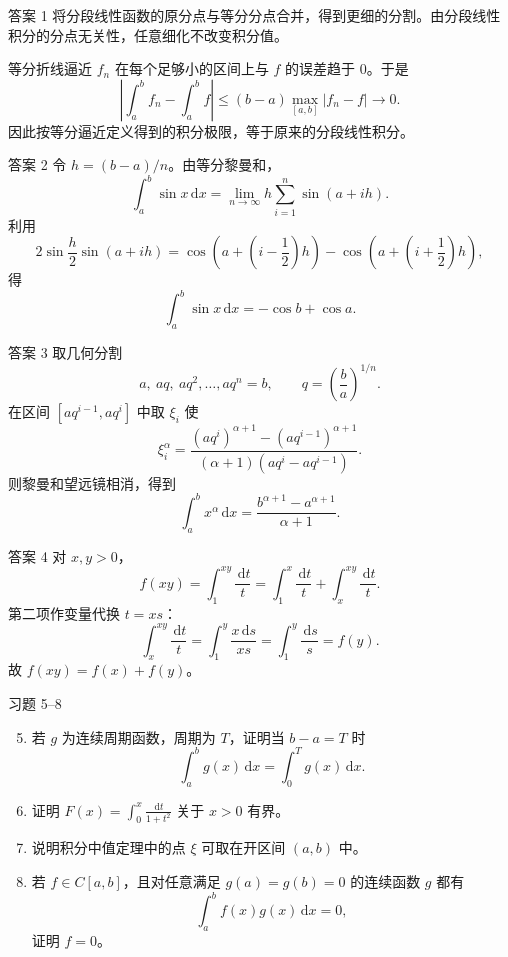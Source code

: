 ﻿\documentclass[aspectratio=169,11pt]{ctexbeamer}
\newcommand{\dd}{\,\mathrm{d}}
\newcommand{\abs}[1]{\left|#1\right|}
\begin{document}
\begin{frame}{答案 1}
  将分段线性函数的原分点与等分分点合并，得到更细的分割。由分段线性积分的分点无关性，任意细化不改变积分值。

  等分折线逼近 $f_n$ 在每个足够小的区间上与 $f$ 的误差趋于 $0$。于是
  \[
    \abs{\int_a^b f_n-\int_a^b f}
    \le (b-a)\max_{[a,b]}\abs{f_n-f}\to0.
  \]
  因此按等分逼近定义得到的积分极限，等于原来的分段线性积分。
\end{frame}

\begin{frame}{答案 2}
  令 $h=(b-a)/n$。由等分黎曼和，
  \[
    \int_a^b\sin x\dd x
    =\lim_{n\to\infty}h\sum_{i=1}^{n}\sin(a+ih).
  \]
  利用
  \[
    2\sin\frac h2\sin(a+ih)
    =\cos\!\left(a+\left(i-\frac12\right)h\right)
     -\cos\!\left(a+\left(i+\frac12\right)h\right),
  \]
  得
  \[
    \int_a^b\sin x\dd x
    =-\cos b+\cos a.
  \]
\end{frame}

\begin{frame}{答案 3}
  取几何分割
  \[
    a,\ aq,\ aq^2,\ldots,aq^n=b,\qquad q=\left(\frac ba\right)^{1/n}.
  \]
  在区间 $[aq^{i-1},aq^i]$ 中取 $\xi_i$ 使
  \[
    \xi_i^\alpha=\frac{(aq^i)^{\alpha+1}-(aq^{i-1})^{\alpha+1}}
    {(\alpha+1)(aq^i-aq^{i-1})}.
  \]
  则黎曼和望远镜相消，得到
  \[
    \int_a^b x^\alpha\dd x
    =\frac{b^{\alpha+1}-a^{\alpha+1}}{\alpha+1}.
  \]
\end{frame}

\begin{frame}{答案 4}
  对 $x,y>0$，
  \[
    f(xy)=\int_1^{xy}\frac{\dd t}{t}
    =\int_1^x\frac{\dd t}{t}+\int_x^{xy}\frac{\dd t}{t}.
  \]
  第二项作变量代换 $t=xs$：
  \[
    \int_x^{xy}\frac{\dd t}{t}
    =\int_1^y\frac{x\dd s}{xs}
    =\int_1^y\frac{\dd s}{s}=f(y).
  \]
  故 $f(xy)=f(x)+f(y)$。
\end{frame}

\begin{frame}{习题 5--8}
  \begin{enumerate}
    \setcounter{enumi}{4}
    \item 若 $g$ 为连续周期函数，周期为 $T$，证明当 $b-a=T$ 时
    \[
      \int_a^b g(x)\dd x=\int_0^T g(x)\dd x.
    \]
    \item 证明 $F(x)=\displaystyle\int_0^x\frac{\dd t}{1+t^2}$ 关于 $x>0$ 有界。
    \item 说明积分中值定理中的点 $\xi$ 可取在开区间 $(a,b)$ 中。
    \item 若 $f\in C[a,b]$，且对任意满足 $g(a)=g(b)=0$ 的连续函数 $g$ 都有
    \[
      \int_a^b f(x)g(x)\dd x=0,
    \]
    证明 $f=0$。
  \end{enumerate}
\end{frame}
\end{document}
